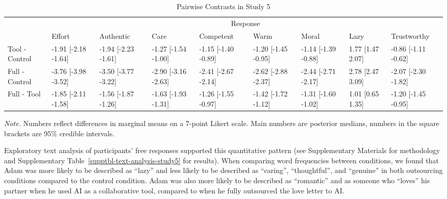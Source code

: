 \documentclass[
  man,
  floatsintext,
  longtable,
  nolmodern,
  notxfonts,
  notimes,
  colorlinks=true,linkcolor=blue,citecolor=blue,urlcolor=blue]{apa7}
\begin{document}
\begin{landscape}

\begin{table}

{\caption{{Pairwise Contrasts in Study 5
\vspace{20pt}}{\label{tbl-treatment-diffs-study5}}}
\vspace{-20pt}}

\begingroup\fontsize{8}{10}\selectfont

\begin{tabular}{lllllllll}
\toprule
\multicolumn{1}{c}{ } & \multicolumn{8}{c}{Response} \\
\cmidrule(l{3pt}r{3pt}){2-9}
  & Effort & Authentic & Care & Competent & Warm & Moral & Lazy & Trustworthy\\
\midrule
Tool - Control & -1.91 [-2.18 -1.64] & -1.94 [-2.23 -1.61] & -1.27 [-1.54 -1.00] & -1.15 [-1.40 -0.89] & -1.20 [-1.45 -0.95] & -1.14 [-1.39 -0.88] & 1.77 [1.47 2.07] & -0.86 [-1.11 -0.62]\\
Full - Control & -3.76 [-3.98 -3.52] & -3.50 [-3.77 -3.22] & -2.90 [-3.16 -2.63] & -2.41 [-2.67 -2.14] & -2.62 [-2.88 -2.37] & -2.44 [-2.71 -2.17] & 2.78 [2.47 3.09] & -2.07 [-2.30 -1.82]\\
Full - Tool & -1.85 [-2.11 -1.58] & -1.56 [-1.87 -1.26] & -1.63 [-1.93 -1.31] & -1.26 [-1.55 -0.97] & -1.42 [-1.72 -1.12] & -1.31 [-1.60 -1.02] & 1.01 [0.65 1.35] & -1.20 [-1.45 -0.95]\\
\bottomrule
\end{tabular}
\endgroup{}\vspace{40pt}

\vspace{-20pt}
\noindent \emph{Note.} Numbers reflect differences in marginal means on
a 7-point Likert scale. Main numbers are posterior medians, numbers in
the square brackets are 95\% credible intervals.

\end{table}

\end{landscape}

Exploratory text analysis of participants' free responses supported this
quantitative pattern (see Supplementary Materials for methodology and
Supplementary Table~\ref{supptbl-text-analysis-study5} for results).
When comparing word frequencies between conditions, we found that Adam
was more likely to be described as ``lazy'' and less likely to be
described as ``caring'', ``thoughtful'', and ``genuine'' in both
outsourcing conditions compared to the control condition. Adam was also
more likely to be described as ``romantic'' and as someone who ``loves''
his partner when he used AI as a collaborative tool, compared to when he
fully outsourced the love letter to AI.
\end{document}
